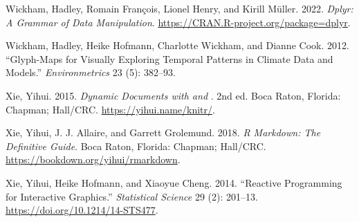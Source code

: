 \documentclass{article}
\newlength{\cslhangindent}
\newlength{\cslentryspacingunit} %
\newenvironment{CSLReferences}[2] %
 {%
  \setlength{\parindent}{0pt}
  \ifodd #1
  \let\oldpar\par
  \def\par{\hangindent=\cslhangindent\oldpar}
  \fi
  \setlength{\parskip}{#2\cslentryspacingunit}
 }%
 {}
\begin{document}
\begin{CSLReferences}{1}{0}
\leavevmode{}%
Wickham, Hadley, Romain François, Lionel Henry, and Kirill Müller. 2022. \emph{Dplyr: A Grammar of Data Manipulation}. \url{https://CRAN.R-project.org/package=dplyr}.

\leavevmode{}%
Wickham, Hadley, Heike Hofmann, Charlotte Wickham, and Dianne Cook. 2012. {``Glyph-Maps for Visually Exploring Temporal Patterns in Climate Data and Models.''} \emph{Environmetrics} 23 (5): 382--93.

\leavevmode{}%
Xie, Yihui. 2015. \emph{Dynamic Documents with  and }. 2nd ed. Boca Raton, Florida: Chapman; Hall/CRC. \url{https://yihui.name/knitr/}.

\leavevmode{}%
Xie, Yihui, J. J. Allaire, and Garrett Grolemund. 2018. \emph{R Markdown: The Definitive Guide}. Boca Raton, Florida: Chapman; Hall/CRC. \url{https://bookdown.org/yihui/rmarkdown}.

\leavevmode{}%
Xie, Yihui, Heike Hofmann, and Xiaoyue Cheng. 2014. {``{Reactive Programming for Interactive Graphics}.''} \emph{Statistical Science} 29 (2): 201--13. \url{https://doi.org/10.1214/14-STS477}.

\end{CSLReferences}



\end{document}
